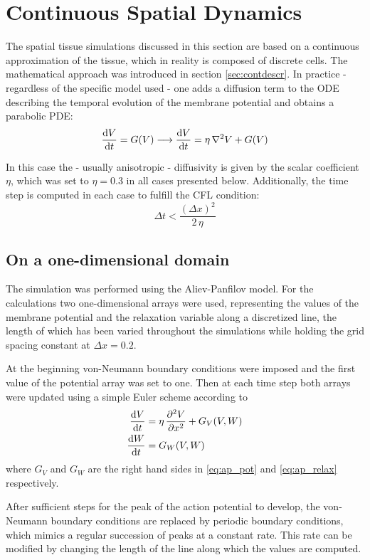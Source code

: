 \section{Continuous Spatial Dynamics}
The spatial tissue simulations discussed in this section are based on a
continuous approximation of the tissue, which in reality is composed of
discrete cells. The mathematical approach was introduced in section
\ref{sec:contdescr}. In practice - regardless of the specific model used - one
adds a diffusion term to the ODE describing the temporal evolution of the
membrane potential and obtains a parabolic PDE:
\begin{equation}
    \dv{V}{t}=G(V)\longrightarrow\dv{V}{t}=\eta\,\nabla^2{V}+G(V)
\end{equation}

In this case the - usually anisotropic - diffusivity is given by the scalar
coefficient $\eta$, which was set to $\eta=0.3$ in all cases presented below.
Additionally, the time step is computed in each case to fulfill the CFL
condition:
\begin{equation*}
    \Delta{t}<\frac{(\Delta{x})^2}{2\,\eta}
\end{equation*}


\subsection{On a one-dimensional domain}
The simulation was performed using the Aliev-Panfilov model. For the
calculations two one-dimensional arrays were used, representing the values of the membrane
potential and the relaxation variable along a discretized line, the length of
which has been varied throughout the simulations while holding the grid
spacing constant at $\Delta{x}=0.2$.

At the beginning von-Neumann boundary conditions were imposed and the first
value of the potential array was set to one. Then at each time step both arrays
were updated using a simple Euler scheme according to
\begin{align*}
    \dv{V}{t}&=\eta\,\pdv[2]{V}{x}+G_{V}(V, W) \\
    \dv{W}{t}&=G_{W}(V, W)
\end{align*}
where $G_V$ and $G_W$ are the right hand sides in \eqref{eq:ap_pot} and
\eqref{eq:ap_relax} respectively.

After sufficient steps for the peak of the action potential to develop, the
von-Neumann boundary conditions are replaced by periodic boundary
conditions, which mimics a regular succession of peaks at a constant rate.
This rate can be modified by changing the length of the line along which the
values are computed.

